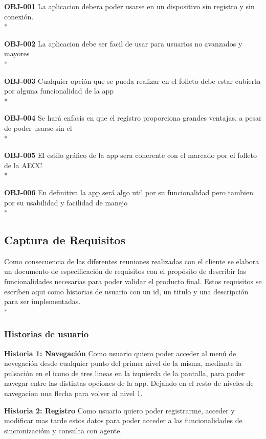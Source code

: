 \documentclass[../pfc.tex]{subfiles}
\begin{document}
	
	\textbf{OBJ-001}	La aplicacion debera poder usarse en un dispositivo sin registro y sin conexión.\\*
	
	\textbf{OBJ-002}	La aplicacion debe ser facil de usar para usuarios no avanzados y mayores\\*
	
	\textbf{OBJ-003}	Cualquier opción que se pueda realizar en el folleto debe estar cubierta por alguna funcionalidad de la app\\*
	
	\textbf{OBJ-004}	Se hará enfasis en que el registro proporciona grandes ventajas, a pesar de poder usarse sin el\\*

	\textbf{OBJ-005}	El estilo gráfico de la app sera coherente con el marcado por el folleto de la AECC\\*
	
	\textbf{OBJ-006}	En definitiva la app será algo util por su funcionalidad pero tambien por su usabilidad y facilidad de manejo\\*
	
	
	\subsection{Captura de Requisitos}
	
	Como consecuencia de las diferentes reuniones realizadas con el cliente se elabora un
	documento de especificación de requisitos con el propósito de describir las funcionalidades
	necesarias para poder validar el producto final. Estos requisitos se escriben aqui como historias de usuario con un id, un titulo y una descripción para ser implementadas. \\*
	
	\subsubsection{Historias de usuario}
			
	\textbf{Historia 1: Navegación}
		Como usuario quiero poder acceder al menú de nevegación desde cualquier punto del primer nivel de la misma, mediante la pulsación en el icono de tres lineas en la izquierda de la pantalla, para poder navegar entre las distintas opciones de la app. Dejando en el resto de niveles de navegacion una flecha para volver al nivel 1.
		
	\textbf{Historia 2: Registro}	
		Como usuario quiero poder registrarme, acceder y modificar mas tarde estos datos para poder acceder a las funcionalidades de sincronizacióm y consulta con agente.
	
\end{document}
